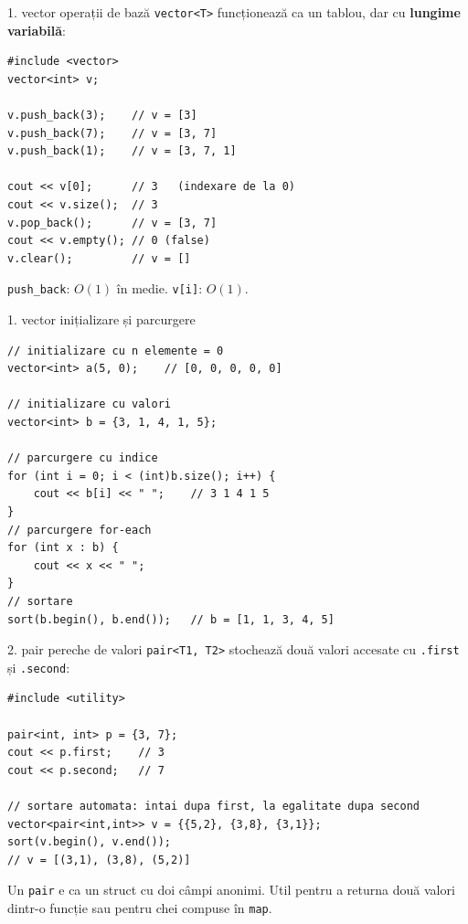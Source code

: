 ﻿\documentclass{beamer}
\begin{document}
\begin{frame}[fragile]{1. vector \textemdash{} operații de bază}
  \texttt{vector<T>} funcționează ca un tablou, dar cu \textbf{lungime variabilă}:

  \begin{lstlisting}
#include <vector>
vector<int> v;

v.push_back(3);    // v = [3]
v.push_back(7);    // v = [3, 7]
v.push_back(1);    // v = [3, 7, 1]

cout << v[0];      // 3   (indexare de la 0)
cout << v.size();  // 3
v.pop_back();      // v = [3, 7]
cout << v.empty(); // 0 (false)
v.clear();         // v = []
  \end{lstlisting}

  \texttt{push\_back}: $O(1)$ în medie. \quad
  \texttt{v[i]}: $O(1)$.
\end{frame}

\begin{frame}[fragile]{1. vector \textemdash{} inițializare și parcurgere}
  \begin{lstlisting}
// initializare cu n elemente = 0
vector<int> a(5, 0);    // [0, 0, 0, 0, 0]

// initializare cu valori
vector<int> b = {3, 1, 4, 1, 5};

// parcurgere cu indice
for (int i = 0; i < (int)b.size(); i++) {
    cout << b[i] << " ";    // 3 1 4 1 5
}
// parcurgere for-each
for (int x : b) {
    cout << x << " ";
}
// sortare
sort(b.begin(), b.end());   // b = [1, 1, 3, 4, 5]
  \end{lstlisting}
\end{frame}

\begin{frame}[fragile]{2. pair \textemdash{} pereche de valori}
  \texttt{pair<T1,\,T2>} stochează două valori accesate cu
  \texttt{.first} și \texttt{.second}:

  \begin{lstlisting}
#include <utility>

pair<int, int> p = {3, 7};
cout << p.first;    // 3
cout << p.second;   // 7

// sortare automata: intai dupa first, la egalitate dupa second
vector<pair<int,int>> v = {{5,2}, {3,8}, {3,1}};
sort(v.begin(), v.end());
// v = [(3,1), (3,8), (5,2)]
  \end{lstlisting}

  \smallskip
  Un \texttt{pair} e ca un struct cu doi câmpi anonimi.
  Util pentru a returna două valori dintr-o funcție sau
  pentru chei compuse în \texttt{map}.
\end{frame}
\end{document}
